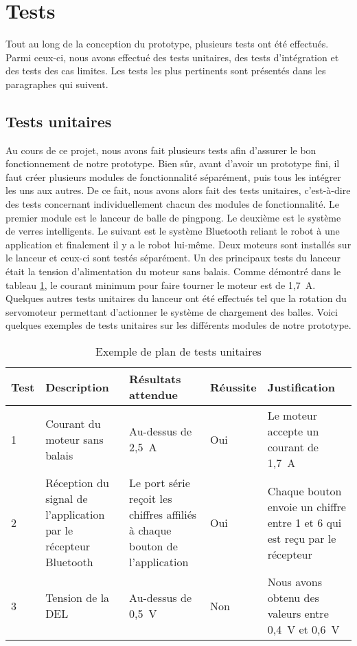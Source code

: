 \section{Tests}


Tout au long de la conception du prototype, plusieurs tests ont été effectués.
Parmi ceux-ci, nous avons effectué des tests unitaires, des tests d'intégration et des tests des cas limites.
Les tests les plus pertinents sont présentés dans les paragraphes qui suivent.

\subsection{Tests unitaires}

Au cours de ce projet, nous avons fait plusieurs tests afin d’assurer le bon fonctionnement de notre prototype.
Bien sûr, avant d’avoir un prototype fini, il faut créer plusieurs modules de fonctionnalité séparément, puis tous les intégrer les uns aux autres.
De ce fait, nous avons alors fait des tests unitaires, c’est-à-dire des tests concernant individuellement chacun des modules de fonctionnalité.
Le premier module est le lanceur de balle de pingpong.
Le deuxième est le système de verres intelligents.
Le suivant est le système Bluetooth reliant le robot à une application et finalement il y a le robot lui-même.
Deux moteurs sont installés sur le lanceur et ceux-ci sont testés séparément.
Un des principaux tests du lanceur était la tension d’alimentation du moteur sans balais.
Comme démontré dans le tableau \ref{tab:s3-test-unitaires}, le courant minimum pour faire tourner le moteur est de 1,7~A.
Quelques autres tests unitaires du lanceur ont été effectués tel que la rotation du servomoteur permettant d’actionner le système de chargement des balles.
Voici quelques exemples de tests unitaires sur les différents modules de notre prototype.

\begin{table}[h!]
    \centering
    \begin{tabular}{p{0.25in}p{1.5in}p{1.5in}p{0.5in}p{1.5in}}
        \hline
        \bfseries Test & \bfseries Description & \bfseries Résultats attendue & \bfseries Réussite & \bfseries Justification \\
        \hline\hline
        1 & Courant du moteur sans balais & Au-dessus de 2,5~A & Oui & Le moteur accepte un courant de 1,7~A \\
        2 & Réception du signal de l’application par le récepteur Bluetooth & Le port série reçoit les chiffres affiliés à chaque bouton de l’application & Oui & Chaque bouton envoie un chiffre entre 1 et 6 qui est reçu par le récepteur \\
        3 & Tension de la DEL & Au-dessus de 0,5~V & Non & Nous avons obtenu des valeurs entre 0,4~V et 0,6~V \\
        \hline
    \end{tabular}
    \caption{Exemple de plan de tests unitaires}
    \label{tab:s3-test-unitaires}
\end{table}

